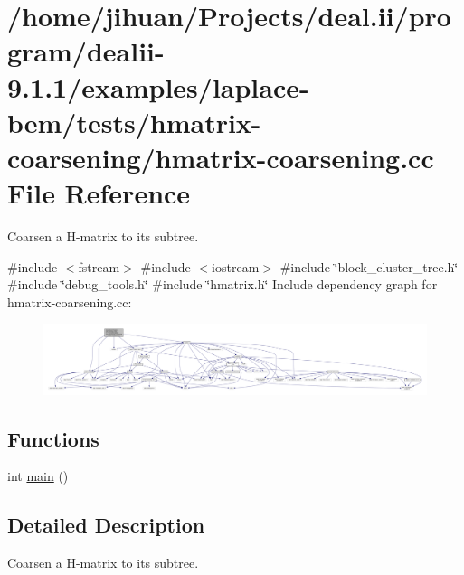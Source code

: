 \hypertarget{hmatrix-coarsening_8cc}{}\section{/home/jihuan/\+Projects/deal.ii/program/dealii-\/9.1.1/examples/laplace-\/bem/tests/hmatrix-\/coarsening/hmatrix-\/coarsening.cc File Reference}
\label{hmatrix-coarsening_8cc}


Coarsen a H-\/matrix to its subtree.  


{\ttfamily \#include $<$fstream$>$}\newline
{\ttfamily \#include $<$iostream$>$}\newline
{\ttfamily \#include \char`\"{}block\+\_\+cluster\+\_\+tree.\+h\char`\"{}}\newline
{\ttfamily \#include \char`\"{}debug\+\_\+tools.\+h\char`\"{}}\newline
{\ttfamily \#include \char`\"{}hmatrix.\+h\char`\"{}}\newline
Include dependency graph for hmatrix-\/coarsening.cc\+:\nopagebreak
\begin{figure}[H]
\begin{center}
\leavevmode
\includegraphics[width=350pt]{hmatrix-coarsening_8cc__incl}
\end{center}
\end{figure}
\subsection*{Functions}
\begin{DoxyCompactItemize}
\item 
int \hyperlink{hmatrix-coarsening_8cc_ae66f6b31b5ad750f1fe042a706a4e3d4}{main} ()
\end{DoxyCompactItemize}


\subsection{Detailed Description}
Coarsen a H-\/matrix to its subtree. 

